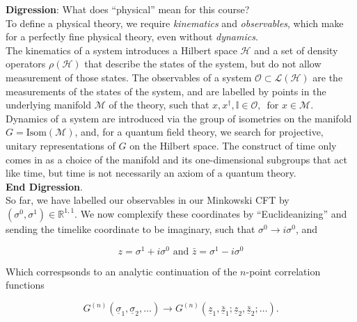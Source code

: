 \noindent \textbf{Digression}: What does ``physical'' mean for this course? \\

\noindent To define a physical theory, we require \textit{kinematics} and \textit{observables}, which make for a perfectly fine physical theory, even without \textit{dynamics}. \\

\noindent The kinematics of a system introduces a Hilbert space $\mathcal{H}$ and a set of density operators $\rho(\mathcal{H})$ that describe the states of the system, but do not allow measurement of those states. The observables of a system $\mathcal{O} \subset \mathcal{L}(\mathcal{H})$ are the measurements of the states of the system, and are labelled by points in the underlying manifold $\mathcal{M}$ of the theory, such that $x, x^\dagger, \mathbb{I} \in \mathcal{O}, \, \text{ for } x \in \mathcal{M}$. \\

\noindent Dynamics of a system are introduced via the group of isometries on the manifold $G = \text{Isom}(\mathcal{M})$, and, for a quantum field theory, we search for projective, unitary representations of $G$ on the Hilbert space. The construct of time only comes in as a choice of the manifold and its one-dimensional subgroups that act like time, but time is not necessarily an axiom of a quantum theory. \\

\noindent \textbf{End Digression}. \\

\noindent So far, we have labelled our observables in our Minkowski CFT by $(\sigma^0, \sigma^1) \in \mathbb{R}^{1,1}$. We now complexify these coordinates by ``Euclideanizing'' and sending the timelike coordinate to be imaginary, such that $\sigma^0 \rightarrow i \sigma^0$, and 

\begin{equation}
z = \sigma^1 + i \sigma^0 \text{ and } \bar{z} = \sigma^1 - i \sigma^0
\end{equation}

\noindent Which correspsonds to an analytic continuation of the $n$-point correlation functions

\begin{equation}
G^{(n)} (\underline{\sigma}_1, \underline{\sigma}_2, \dots) \rightarrow G^{(n)} (\underline{z}_1, \bar{\underline{z}}_1; \underline{z}_2, \bar{\underline{z}}_2; \dots).
\end{equation}

